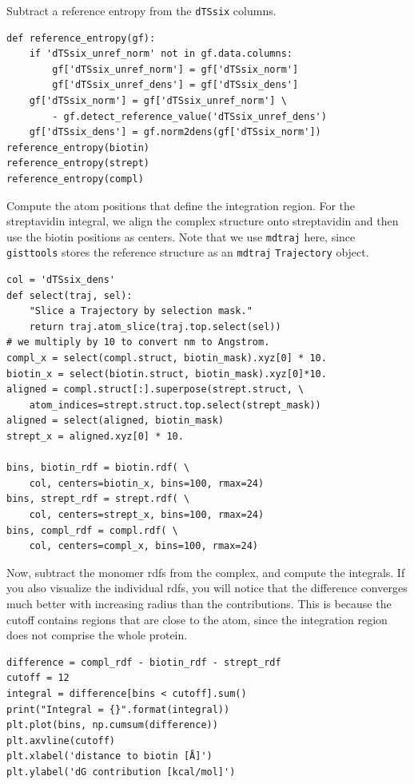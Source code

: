 \documentclass[9pt,tutorial]{livecoms}
\newcommand{\software}{\texttt}
\newcommand\inlinecode{\texttt}
\begin{document}
Subtract a reference entropy from the \inlinecode{dTSsix} columns.

\begin{lstlisting}[style=python]
def reference_entropy(gf):
    if 'dTSsix_unref_norm' not in gf.data.columns:
        gf['dTSsix_unref_norm'] = gf['dTSsix_norm']
        gf['dTSsix_unref_dens'] = gf['dTSsix_dens']
    gf['dTSsix_norm'] = gf['dTSsix_unref_norm'] \
        - gf.detect_reference_value('dTSsix_unref_dens')
    gf['dTSsix_dens'] = gf.norm2dens(gf['dTSsix_norm'])
reference_entropy(biotin)
reference_entropy(strept)
reference_entropy(compl)
\end{lstlisting}

Compute the atom positions that define the integration region.
For the streptavidin integral, we align the complex structure onto streptavidin and then use the biotin positions as centers.
Note that we use \software{mdtraj} here, since \software{gisttools} stores the reference structure as an \software{mdtraj} \inlinecode{Trajectory} object.
\begin{lstlisting}[style=python]
col = 'dTSsix_dens'
def select(traj, sel):
    "Slice a Trajectory by selection mask."
    return traj.atom_slice(traj.top.select(sel))
# we multiply by 10 to convert nm to Angstrom.
compl_x = select(compl.struct, biotin_mask).xyz[0] * 10.
biotin_x = select(biotin.struct, biotin_mask).xyz[0]*10.
aligned = compl.struct[:].superpose(strept.struct, \
    atom_indices=strept.struct.top.select(strept_mask))
aligned = select(aligned, biotin_mask)
strept_x = aligned.xyz[0] * 10.

bins, biotin_rdf = biotin.rdf( \
    col, centers=biotin_x, bins=100, rmax=24)
bins, strept_rdf = strept.rdf( \
    col, centers=strept_x, bins=100, rmax=24)
bins, compl_rdf = compl.rdf( \
    col, centers=compl_x, bins=100, rmax=24)
\end{lstlisting}

Now, subtract the monomer rdfs from the complex, and compute the integrals.
If you also visualize the individual rdfs, you will notice that the difference converges much better with increasing radius than the contributions.
This is because the cutoff contains regions that are close to the atom, since the integration region does not comprise the whole protein.

\begin{lstlisting}[style=python]
difference = compl_rdf - biotin_rdf - strept_rdf
cutoff = 12
integral = difference[bins < cutoff].sum()
print("Integral = {}".format(integral))
plt.plot(bins, np.cumsum(difference))
plt.axvline(cutoff)
plt.xlabel('distance to biotin [Å]')
plt.ylabel('dG contribution [kcal/mol]')
\end{lstlisting}
\end{document}

